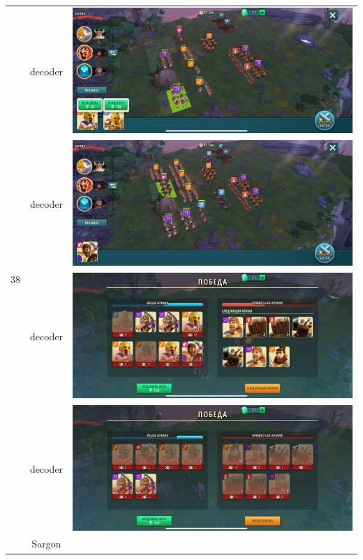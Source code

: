 \begin{longtable}{|c|c|c|}
    \hline
    \multirow{8}{*}{38} & decoder &
    \includegraphics[width=0.75\linewidth]{./parts/media/TreasureHunt/38/decoder/photo_2022-04-07_10-10-19.jpg} \\
    & decoder &
    \includegraphics[width=0.75\linewidth]{./parts/media/TreasureHunt/38/decoder/photo_2022-04-07_10-10-01.jpg} \\
    & decoder &
    \includegraphics[width=0.75\linewidth]{./parts/media/TreasureHunt/38/decoder/photo_2022-04-07_10-10-16.jpg} \\
    & decoder &
    \includegraphics[width=0.75\linewidth]{./parts/media/TreasureHunt/38/decoder/photo_2022-04-07_10-10-23.jpg} \\
    \hline
    \multirow{8}{*}{38} & Sargon &

\end{longtable}
